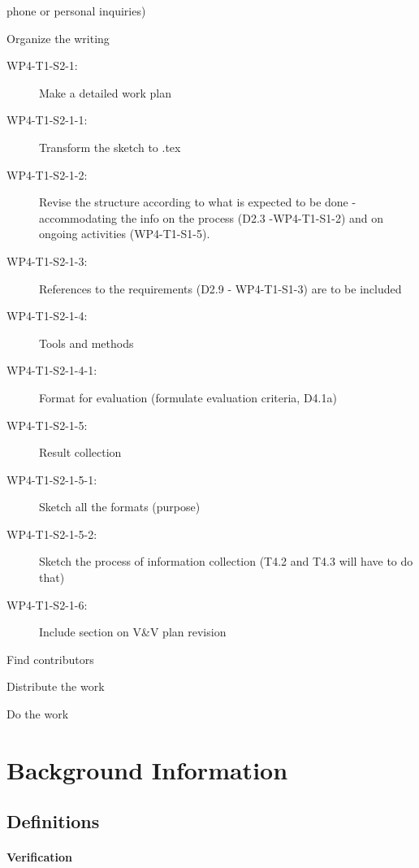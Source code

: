 \documentclass{template/openetcs_report}
\begin{document}
{\begin{description}
\begin{description}
\begin{description}
      phone or personal inquiries) 
    \end{description}
  \item[WP4-T1-S2:] Organize the writing 
    \begin{description}
    \item[WP4-T1-S2-1:] Make a detailed work plan
    \item[WP4-T1-S2-1-1:] Transform the sketch to .tex
    \item[WP4-T1-S2-1-2:] Revise the structure according to what is
      expected to be done - accommodating the info on the process (D2.3
      -WP4-T1-S1-2) and on ongoing activities  (WP4-T1-S1-5). 
    \item[WP4-T1-S2-1-3:] References to the requirements (D2.9 -
      WP4-T1-S1-3) are to be included 
    \item[WP4-T1-S2-1-4:] Tools and methods
    \item[WP4-T1-S2-1-4-1:] Format for evaluation (formulate
      evaluation criteria, D4.1a) 
    \item[WP4-T1-S2-1-5:] Result collection
    \item[WP4-T1-S2-1-5-1:] Sketch all the formats (purpose)
    \item[WP4-T1-S2-1-5-2:] Sketch the process of information collection
      (T4.2 and T4.3 will have to do that) 
    \item[WP4-T1-S2-1-6:] Include section on V\&V plan revision
    \end{description}
  \item[WP4-T1-S2-2:] Find contributors
  \item[WP4-T1-S2-3:] Distribute the work
  \end{description}
\item[WP4-T1-S3:]  Do the work
\end{description}  
}

\section{Background Information}
\label{sec:backgr-inform}


\subsection{Definitions}

\paragraph{Verification}
\end{document}
